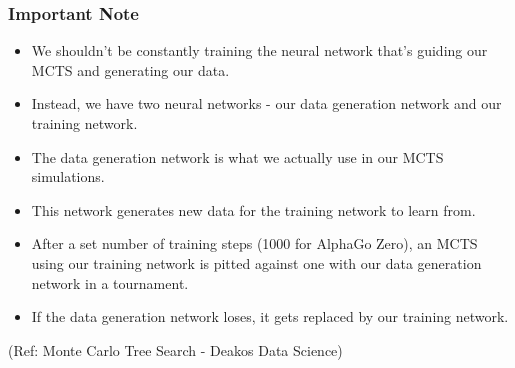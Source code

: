 \begin{frame}[fragile]\frametitle{Important Note}

\begin{itemize}
\item We shouldn't be constantly training the neural network that's guiding our MCTS and generating our data. 
\item Instead, we have two neural networks - our data generation network and our training network. 
\item The data generation network is what we actually use in our MCTS simulations. 
\item This network generates new data for the training network to learn from. 
\item After a set number of training steps (1000 for AlphaGo Zero), an MCTS using our training network is pitted against one with our data generation network in a tournament. 
\item If the data generation network loses, it gets replaced by our training network.
\end{itemize}


{\tiny (Ref: Monte Carlo Tree Search - Deakos Data Science)}

\end{frame}





